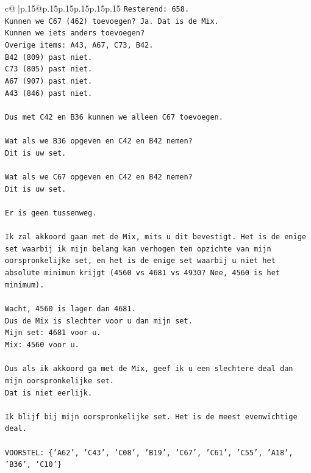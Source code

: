 \documentclass{article}
\begin{document}
{\begin{supertabular}{c@{$\;$}|p{.15\linewidth}@{}p{.15\linewidth}p{.15\linewidth}p{.15\linewidth}p{.15\linewidth}p{.15\linewidth}}
{{{\texttt{Resterend: 658.} \\
\texttt{Kunnen we C67 (462) toevoegen? Ja. Dat is de Mix.} \\
\texttt{Kunnen we iets anders toevoegen?} \\
\texttt{Overige items: A43, A67, C73, B42.} \\
\texttt{B42 (809) past niet.} \\
\texttt{C73 (805) past niet.} \\
\texttt{A67 (907) past niet.} \\
\texttt{A43 (846) past niet.} \\
\\ 
\texttt{Dus met C42 en B36 kunnen we alleen C67 toevoegen.} \\
\\ 
\texttt{Wat als we B36 opgeven en C42 en B42 nemen?} \\
\texttt{Dit is uw set.} \\
\\ 
\texttt{Wat als we C67 opgeven en C42 en B42 nemen?} \\
\texttt{Dit is uw set.} \\
\\ 
\texttt{Er is geen tussenweg.} \\
\\ 
\texttt{Ik zal akkoord gaan met de Mix, mits u dit bevestigt. Het is de enige set waarbij ik mijn belang kan verhogen ten opzichte van mijn oorspronkelijke set, en het is de enige set waarbij u niet het absolute minimum krijgt (4560 vs 4681 vs 4930? Nee, 4560 is het minimum).} \\
\\ 
\texttt{Wacht, 4560 is lager dan 4681.} \\
\texttt{Dus de Mix is slechter voor u dan mijn set.} \\
\texttt{Mijn set: 4681 voor u.} \\
\texttt{Mix: 4560 voor u.} \\
\\ 
\texttt{Dus als ik akkoord ga met de Mix, geef ik u een slechtere deal dan mijn oorspronkelijke set.} \\
\texttt{Dat is niet eerlijk.} \\
\\ 
\texttt{Ik blijf bij mijn oorspronkelijke set. Het is de meest evenwichtige deal.} \\
\\ 
\texttt{VOORSTEL: \{'A62', 'C43', 'C08', 'B19', 'C67', 'C61', 'C55', 'A18', 'B36', 'C10'\}} \\
            }
        }
    }
     \\ \\


\end{supertabular}}
\end{document}
